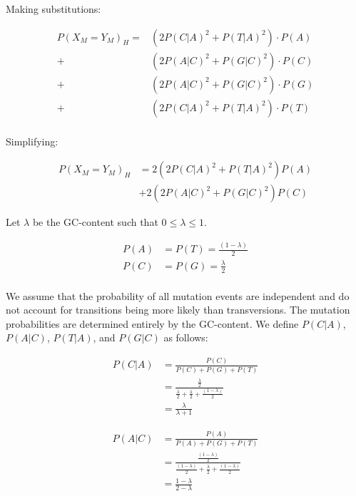 \documentclass{article}
\begin{document}
Making substitutions:
  
\begin{equation}
\begin{split}
  P(X_{M} = Y_{M})_{H} = &(2P(C|A)^2 + P(T|A)^2) \cdot P(A) \\
    + &(2P(A|C)^2 + P(G|C)^2) \cdot P(C) \\
    + &(2P(A|C)^2 + P(G|C)^2) \cdot P(G) \\
    + &(2P(C|A)^2 + P(T|A)^2) \cdot P(T) \\
\end{split}
\end{equation}
  
Simplifying:  

\begin{equation}
\begin{split}
  P(X_{M} = Y_{M})_{H} &= 2 (2 P(C|A)^2 + P(T|A)^2) P(A) \\
    &+ 2 (2 P(A|C)^2 + P(G|C)^2) P(C)
\end{split}
\label{eq:prob-mutate-match-simplify}
\end{equation}
  
Let \(\lambda\) be the GC-content such that \(0 \leq \lambda \leq 1\).

\begin{equation}
\begin{split}
  P(A) &= P(T) = \frac{(1 - \lambda)}{2}\\
  P(C) &= P(G) = \frac{\lambda}{2}\\
\end{split}
\end{equation}
  
We assume that the probability of all mutation events are independent and do not account for transitions being more likely than transversions. The mutation probabilities are determined entirely by the GC-content. We define \(P(C|A)\), \(P(A|C)\), \(P(T|A)\), and \(P(G|C)\) as follows:

\begin{equation}
\begin{split}
  P(C|A) &= \frac{P(C)}{P(C) + P(G) + P(T)} \\
    &= \frac{\frac{\lambda}{2}}{\frac{\lambda}{2} + \frac{\lambda}{2} + \frac{(1 - \lambda)}{2}} \\
    &= \frac{\lambda}{\lambda + 1}
\end{split}
\end{equation}

\begin{equation}
\begin{split}
  P(A|C) &= \frac{P(A)}{P(A) + P(G) + P(T)} \\
    &= \frac{\frac{(1 - \lambda)}{2}}{\frac{(1 - \lambda)}{2} + \frac{\lambda}{2} + \frac{(1 - \lambda)}{2}} \\
    &= \frac{1 - \lambda}{2 - \lambda}
\end{split}
\end{equation}
\end{document}
